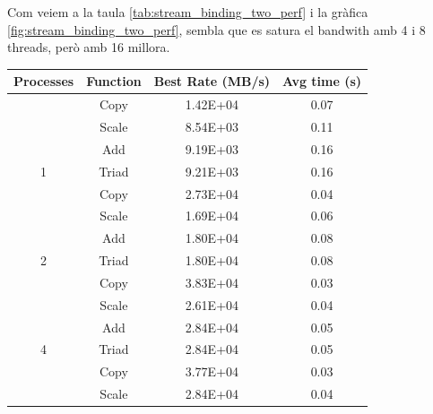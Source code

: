 Com veiem a la taula \ref{tab:stream_binding_two_perf} i la gràfica \ref{fig:stream_binding_two_perf}, sembla que es satura el bandwith amb 4 i 8 threads, però amb 16 millora.
\begin{table}[h]
    \centering
\begin{tabular}{cccc}
Processes            & Function                     & Best Rate (MB/s)                 & Avg time (s)                 \\ \hline
                     & \cellcolor[HTML]{EFEFEF}Copy & \cellcolor[HTML]{EFEFEF}1.42E+04 & \cellcolor[HTML]{EFEFEF}0.07 \\
                     & Scale                        & 8.54E+03                         & 0.11                         \\
                     & \cellcolor[HTML]{EFEFEF}Add  & \cellcolor[HTML]{EFEFEF}9.19E+03 & \cellcolor[HTML]{EFEFEF}0.16 \\
\multirow{-4}{*}{1}  & Triad                        & 9.21E+03                         & 0.16                         \\ \hline
                     & \cellcolor[HTML]{EFEFEF}Copy & \cellcolor[HTML]{EFEFEF}2.73E+04 & \cellcolor[HTML]{EFEFEF}0.04 \\
                     & Scale                        & 1.69E+04                         & 0.06                         \\
                     & \cellcolor[HTML]{EFEFEF}Add  & \cellcolor[HTML]{EFEFEF}1.80E+04 & \cellcolor[HTML]{EFEFEF}0.08 \\
\multirow{-4}{*}{2}  & Triad                        & 1.80E+04                         & 0.08                         \\ \hline
                     & \cellcolor[HTML]{EFEFEF}Copy & \cellcolor[HTML]{EFEFEF}3.83E+04 & \cellcolor[HTML]{EFEFEF}0.03 \\
                     & Scale                        & 2.61E+04                         & 0.04                         \\
                     & \cellcolor[HTML]{EFEFEF}Add  & \cellcolor[HTML]{EFEFEF}2.84E+04 & \cellcolor[HTML]{EFEFEF}0.05 \\
\multirow{-4}{*}{4}  & Triad                        & 2.84E+04                         & 0.05                         \\ \hline
                     & \cellcolor[HTML]{EFEFEF}Copy & \cellcolor[HTML]{EFEFEF}3.77E+04 & \cellcolor[HTML]{EFEFEF}0.03 \\
                     & Scale                        & 2.84E+04                         & 0.04                         \\

\end{tabular}
\end{table}
